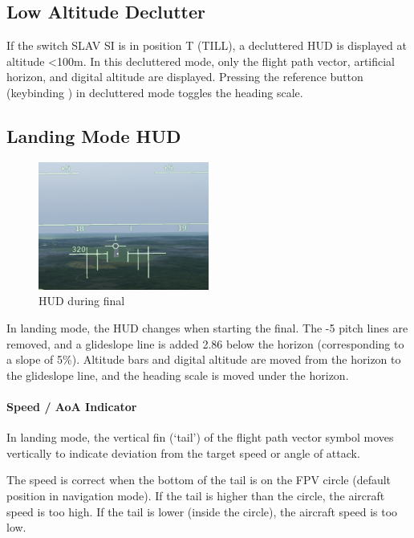 \subsection{Low Altitude Declutter}
\label{sec:hud-declutter}
If the switch SLAV SI is in position T (TILL), a decluttered HUD is displayed at altitude <100m.
In this decluttered mode, only the flight path vector,
artificial horizon, and digital altitude are displayed.
Pressing the reference button (keybinding )
in decluttered mode toggles the heading scale.

\subsection{Landing Mode HUD}
\begin{figure}[!ht]
  \centering
  \includegraphics[width=0.5\textwidth]{images/displays/ajs-hud-landing.png}
  \caption{HUD during final}
  \label{fig:hud-landing}
\end{figure}

In landing mode, the HUD changes when starting the final.
The -5\textdegree{} pitch lines are removed,
and a glideslope line is added 2.86\textdegree{} below the horizon
(corresponding to a slope of 5\%).
Altitude bars and digital altitude are moved from the horizon to the glideslope line,
and the heading scale is moved under the horizon.

\paragraph{Speed / AoA Indicator}
In landing mode, the vertical fin (`tail') of the flight path vector symbol
moves vertically to indicate deviation from the target speed or angle of attack.

The speed is correct when the bottom of the tail is on the FPV circle
(default position in navigation mode).
If the tail is higher than the circle, the aircraft speed is too high.
If the tail is lower (inside the circle), the aircraft speed is too low.

